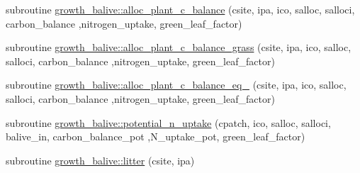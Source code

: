 \begin{DoxyCompactItemize}
\item 
subroutine \hyperlink{namespacegrowth__balive_aa34feeb938e58aab6d26db893e10aff3}{growth\+\_\+balive\+::alloc\+\_\+plant\+\_\+c\+\_\+balance} (csite, ipa, ico, salloc, salloci, carbon\+\_\+balance                                                                                                                                                                                   ,nitrogen\+\_\+uptake, green\+\_\+leaf\+\_\+factor)
\item 
subroutine \hyperlink{namespacegrowth__balive_ab77d0ec4f42b787f4ea60352eb81e7ef}{growth\+\_\+balive\+::alloc\+\_\+plant\+\_\+c\+\_\+balance\+\_\+grass} (csite, ipa, ico, salloc, salloci, carbon\+\_\+balance                                                                                                                                                           ,nitrogen\+\_\+uptake, green\+\_\+leaf\+\_\+factor)
\item 
subroutine \hyperlink{namespacegrowth__balive_a1990f1f2512a5c36c291f32fb7cc8669}{growth\+\_\+balive\+::alloc\+\_\+plant\+\_\+c\+\_\+balance\+\_\+eq\+\_} (csite, ipa, ico, salloc, salloci, carbon\+\_\+balance                                                                                                                                                                                   ,nitrogen\+\_\+uptake, green\+\_\+leaf\+\_\+factor)
\item 
subroutine \hyperlink{namespacegrowth__balive_a4e594938a177edfffccb92437a01074f}{growth\+\_\+balive\+::potential\+\_\+n\+\_\+uptake} (cpatch, ico, salloc, salloci, balive\+\_\+in, carbon\+\_\+balance\+\_\+pot                                                                                                                                       ,N\+\_\+uptake\+\_\+pot, green\+\_\+leaf\+\_\+factor)
\item 
subroutine \hyperlink{namespacegrowth__balive_affc86c9f292d8fa6d67dfe1d0df69337}{growth\+\_\+balive\+::litter} (csite, ipa)
\end{DoxyCompactItemize}
